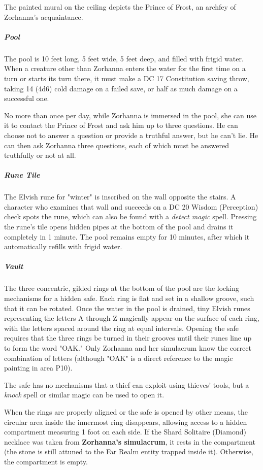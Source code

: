 \documentclass[10pt,a4paper,twoside,bg=print,twocolumn,openany,nodeprecatedcode]{dndbook}
\begin{document}
The painted mural on the ceiling depicts the Prince of Frost, an archfey of Zorhanna's acquaintance.

\subparagraph{Pool}
The pool is 10 feet long, 5 feet wide, 5 feet deep, and filled with frigid water. When a creature other than Zorhanna enters the water for the first time on a turn or starts its turn there, it must make a DC 17 Constitution saving throw, taking 14 (4d6) cold damage on a failed save, or half as much damage on a successful one.

No more than once per day, while Zorhanna is immersed in the pool, she can use it to contact the Prince of Frost and ask him up to three questions. He can choose not to answer a question or provide a truthful answer, but he can't lie. He can then ask Zorhanna three questions, each of which must be answered truthfully or not at all.

\subparagraph{Rune Tile}
The Elvish rune for "winter" is inscribed on the wall opposite the stairs. A character who examines that wall and succeeds on a DC 20 Wisdom (Perception) check spots the rune, which can also be found with a \textit{detect magic} spell. Pressing the rune's tile opens hidden pipes at the bottom of the pool and drains it completely in 1 minute. The pool remains empty for 10 minutes, after which it automatically refills with frigid water.

\subparagraph{Vault}
The three concentric, gilded rings at the bottom of the pool are the locking mechanisms for a hidden safe. Each ring is flat and set in a shallow groove, such that it can be rotated. Once the water in the pool is drained, tiny Elvish runes representing the letters A through Z magically appear on the surface of each ring, with the letters spaced around the ring at equal intervals. Opening the safe requires that the three rings be turned in their grooves until their runes line up to form the word "OAK." Only Zorhanna and her simulacrum know the correct combination of letters (although "OAK" is a direct reference to the magic painting in area P10).

The safe has no mechanisms that a thief can exploit using thieves' tools, but a \textit{knock} spell or similar magic can be used to open it.

When the rings are properly aligned or the safe is opened by other means, the circular area inside the innermost ring disappears, allowing access to a hidden compartment measuring 1 foot on each side. If the Shard Solitaire (Diamond) necklace was taken from \textbf{Zorhanna's simulacrum}, it rests in the compartment (the stone is still attuned to the Far Realm entity trapped inside it). Otherwise, the compartment is empty.
\end{document}
